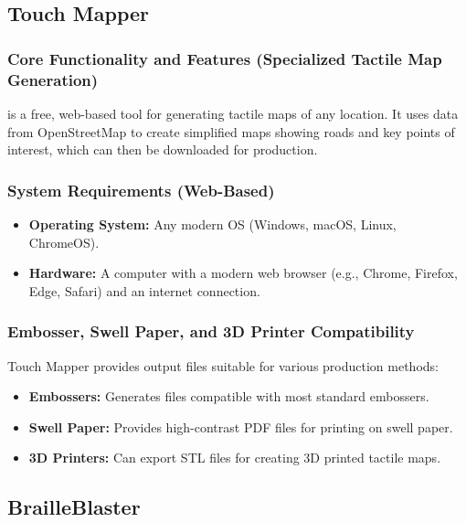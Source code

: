 \subsection{Touch Mapper}\label{ch14:ssec:touch-mapper}
\subsubsection{Core Functionality and Features (Specialized Tactile Map Generation)}\label{ch14:sssec:touch-mapper-features}
 is a free, web-based tool for generating tactile maps of any location\supercite{TouchMapper}. It uses data from OpenStreetMap to create simplified maps showing roads and key points of interest, which can then be downloaded for production.

\subsubsection{System Requirements (Web-Based)}\label{ch14:sssec:touch-mapper-sysreq}
\begin{itemize}
	\item \textbf{Operating System:} Any modern OS (Windows, macOS, Linux, ChromeOS).
	\item \textbf{Hardware:} A computer with a modern web browser (e.g., Chrome, Firefox, Edge, Safari) and an internet connection.
\end{itemize}

\subsubsection{Embosser, Swell Paper, and 3D Printer Compatibility}\label{ch14:sssec:touch-mapper-compat}
Touch Mapper provides output files suitable for various production methods:
\begin{itemize}
	\item \textbf{Embossers:} Generates files compatible with most standard embossers.
	\item \textbf{Swell Paper:} Provides high-contrast PDF files for printing on swell paper.
	\item \textbf{3D Printers:} Can export STL files for creating 3D printed tactile maps\supercite{PerkinsTouchMapper}.
\end{itemize}

\subsection{BrailleBlaster}\label{ch14:ssec:brailleblaster}

